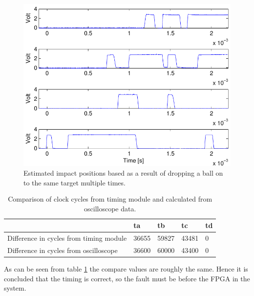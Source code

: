 \begin{figure}[htb]
	\centering
	\includegraphics[width=.8\textwidth]{figures/timingPlot.pdf}
	\caption{Estimated impact positions based as a result of dropping a ball on to the same target multiple times.}
	\label{fig:timingPlot}
\end{figure}
%
\begin{table}[h]
	\begin{tabular}{|l|l|l|l|l|}
		\hline
		 & ta & tb & tc & td \\
		 \hline
		Difference in cycles from timing module & 36655 & 59827 & 43481 & 0 \\
		 \hline
		Difference in cycles from oscilloscope & 36600 &  60000 &  43400 & 0 \\
		\hline
	\end{tabular}
	\caption{Comparison of clock cycles from timing module and calculated from oscilloscope data.}
	\label{tbl:compareCycles}
\end{table}
%
As can be seen from table \ref{tbl:compareCycles} the compare values are roughly the same. Hence it is concluded that the timing is correct, so the fault must be before the FPGA in the system.
